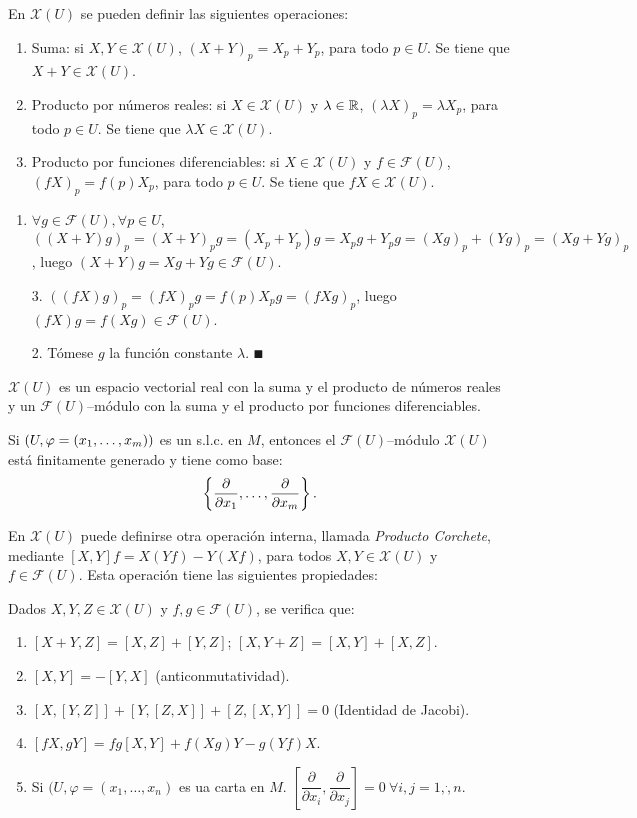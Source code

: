 \documentclass[Cursovd_portada.tex]{subfiles}
\begin{document}
\begin{prop}
En $\mathcal{X}(U)$ se pueden definir las siguientes operaciones:
\begin{enumerate}
\item Suma: si $X,Y\in\mathcal{X}(U)$, $(X+Y)_p=X_p+Y_p$, para todo $p\in U$. Se tiene que $X+Y\in\mathcal{X}(U)$.
\item Producto por números reales: si $X\in\mathcal{X}(U)$ y $\lambda\in\mathbb{R}$, $(\lambda X)_p=\lambda X_p$, para todo
$p\in U$. Se tiene que $\lambda X\in\mathcal{X}(U)$.
\item Producto por funciones diferenciables: si $X\in\mathcal{X}(U)$ y $f\in\mathcal{F}(U)$, $(fX)_p=f(p)X_p$, para todo
$p\in U$. Se tiene que $fX\in\mathcal{X}(U)$.
\end{enumerate}
\end{prop}
\begin{dem}\mbox{}
\begin{enumerate}
\item $\forall g \in \mathcal{F}(U),\forall p\in U$, $((X+Y)g)_p = (X+Y)_pg = (X_p+Y_p)g = X_pg+Y_pg = (Xg)_p+(Yg)_p = (Xg+Yg)_p$, luego $(X+Y)g = Xg+Yg \in \mathcal{F}(U)$.
\item[3.] $((fX)g)_p = (fX)_pg = f(p)X_pg = (fXg)_p$, luego $(fX)g = f(Xg) \in \mathcal{F}(U)$.
\item[2.] Tómese $g$ la función constante $λ$. $\QED$
\end{enumerate}
\end{dem}
\begin{prop} $\mathcal{X}(U)$ es un espacio vectorial real con la suma y el producto de números reales y un
$\mathcal{F}(U)$--módulo con la suma y el producto por funciones diferenciables.
\end{prop}
\begin{prop}
Si $(U,\varphi=(x_1,\dots ,x_m))$ es un s.l.c. en $M$, entonces el $\mathcal{F}(U)$--módulo $\mathcal{X}(U)$ está
finitamente generado y tiene como base:
$$\left\{\displaystyle{\frac{\partial}{\partial x_1}},\dots ,\displaystyle{\frac{\partial}{\partial x_m}}\right\}.$$
\end{prop}
En $\mathcal{X}(U)$ puede definirse otra operación interna, llamada {\it Producto Corchete}, mediante
$[X,Y]f=X(Yf)-Y(Xf)$, para todos $X,Y\in\mathcal{X}(U)$ y $f\in\mathcal{F}(U)$. Esta operación tiene las
siguientes propiedades:
\begin{prop}
Dados $X,Y,Z\in\mathcal{X}(U)$ y $f,g\in\mathcal{F}(U)$, se verifica que:
\begin{enumerate}
\item $[X+Y,Z]=[X,Z]+[Y,Z]$; $[X,Y+Z]=[X,Y]+[X,Z]$.
\item $[X,Y]=-[Y,X]$ (anticonmutatividad).
\item $[X,[Y,Z]]+[Y,[Z,X]]+[Z,[X,Y]]=0$ (Identidad de Jacobi).
\item $[fX,gY]=fg[X,Y]+f(Xg)Y-g(Yf)X$.
\item Si $(U,\varphi=(x_1,\dots,x_n)$ es ua carta en $M$.  $\left[\dfrac{\partial}{\partial x_i},\dfrac{\partial}{\partial x_j}\right]=0\ \forall i,j=1,\dot, n$. 
\end{enumerate}
\end{prop}
\end{document}
